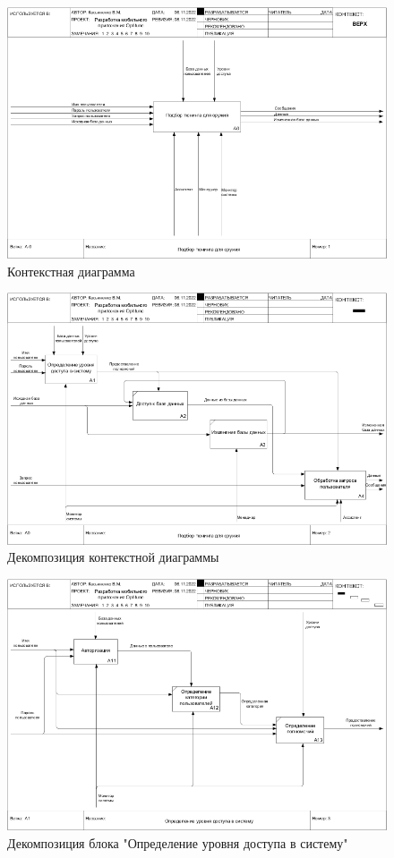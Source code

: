 \documentclass[14pt]{extreport}
\begin{document}
\begin{landscape}
\begin{figure}[H]
\centerline{\includegraphics[width=0.9\linewidth]{01_A-0}}
\caption{Контекстная диаграмма}
\label{fig1}
\end{figure}

\begin{figure}[H]
\centerline{\includegraphics[width=0.9\linewidth]{02_A0}}
\caption{Декомпозиция контекстной диаграммы}
\label{fig2}
\end{figure}

\begin{figure}[H]
\centerline{\includegraphics[width=0.9\linewidth]{03_A1}}
\caption{Декомпозиция блока "Определение уровня доступа в систему"}
\label{fig3}
\end{figure}


\end{landscape}
\end{document}
